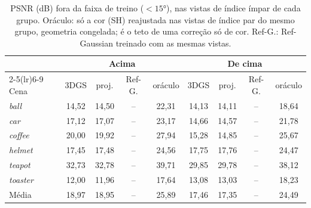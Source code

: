\begin{table}[t]
\centering
\caption{PSNR (dB) fora da faixa de treino ($<15$°), nas vistas de índice ímpar de cada grupo. Oráculo: só a cor (SH) reajustada nas vistas de índice par do mesmo grupo, geometria congelada; é o teto de uma correção só de cor. Ref-G.: Ref-Gaussian treinado com as mesmas vistas.}
\label{tab:decomp15}
\setlength{\tabcolsep}{3pt}
\footnotesize
\begin{tabular}{l cccc cccc}
\toprule
 & \multicolumn{4}{c}{Acima} & \multicolumn{4}{c}{De cima} \\
\cmidrule(lr){2-5}\cmidrule(lr){6-9}
Cena & 3DGS & proj. & Ref-G. & oráculo & 3DGS & proj. & Ref-G. & oráculo \\
\midrule
\textit{ball} & 14{,}52 & 14{,}50 & -- & 22{,}31 & 14{,}13 & 14{,}11 & -- & 18{,}64 \\
\textit{car} & 17{,}12 & 17{,}07 & -- & 23{,}17 & 14{,}66 & 14{,}57 & -- & 21{,}78 \\
\textit{coffee} & 20{,}00 & 19{,}92 & -- & 27{,}94 & 15{,}28 & 14{,}85 & -- & 25{,}67 \\
\textit{helmet} & 17{,}45 & 17{,}48 & -- & 24{,}56 & 17{,}75 & 17{,}76 & -- & 24{,}47 \\
\textit{teapot} & 32{,}73 & 32{,}78 & -- & 39{,}71 & 29{,}85 & 29{,}78 & -- & 38{,}12 \\
\textit{toaster} & 12{,}00 & 11{,}96 & -- & 17{,}64 & 13{,}08 & 13{,}03 & -- & 18{,}23 \\
\midrule
Média & 18{,}97 & 18{,}95 & -- & 25{,}89 & 17{,}46 & 17{,}35 & -- & 24{,}49 \\
\bottomrule
\end{tabular}
\end{table}

